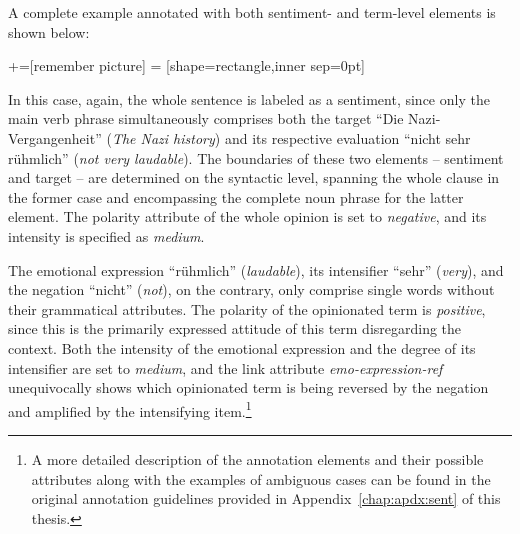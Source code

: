 A complete example annotated with both sentiment- and term-level
elements is shown below:
\begin{example}\label{snt:exmp:sent-anno2}
  +=[remember picture]
   = [shape=rectangle,inner sep=0pt]
  \upshape{}\\[2.2em]
  \noindent{}

\end{example}
In this case, again, the whole sentence is labeled as a sentiment,
since only the main verb phrase simultaneously comprises both the
target ``Die Nazi-Vergangenheit'' (\emph{The Nazi history}) and its
respective evaluation ``nicht sehr r\"uhmlich'' (\emph{not very
  laudable}).  The boundaries of these two elements -- sentiment and
target -- are determined on the syntactic level, spanning the whole
clause in the former case and encompassing the complete noun phrase
for the latter element.  The polarity attribute of the whole opinion
is set to \emph{negative}, and its intensity is specified as
\emph{medium}.

The emotional expression ``r\"uhmlich'' (\emph{laudable}), its
intensifier ``sehr'' (\emph{very}), and the negation ``nicht''
(\emph{not}), on the contrary, only comprise single words without
their grammatical attributes.  The polarity of the opinionated term is
\emph{positive}, since this is the primarily expressed attitude of
this term disregarding the context.  Both the intensity of the
emotional expression and the degree of its intensifier are set to
\emph{medium}, and the link attribute \emph{emo-expression-ref}
unequivocally shows which opinionated term is being reversed by the
negation and amplified by the intensifying item.\footnote{A more
  detailed description of the annotation elements and their possible
  attributes along with the examples of ambiguous cases can be found
  in the original annotation guidelines provided in
  Appendix~\ref{chap:apdx:sent} of this thesis.}

